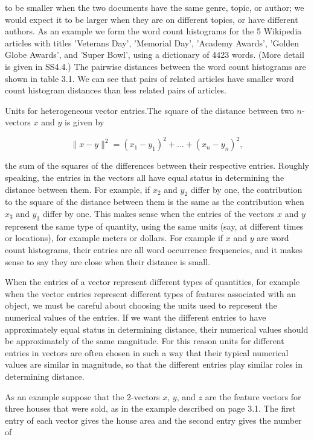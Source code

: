 to be smaller when the two documents have the same genre, topic, or author; we would expect it to be larger when they are on different topics, or have different authors. As an example we form the word count histograms for the 5 Wikipedia articles with titles 'Veterans Day', 'Memorial Day', 'Academy Awards', 'Golden Globe Awards', and 'Super Bowl', using a dictionary of 4423 words. (More detail is given in SS4.4.) The pairwise distances between the word count histograms are shown in table 3.1. We can see that pairs of related articles have smaller word count histogram distances than less related pairs of articles.

Units for heterogeneous vector entries.The square of the distance between two \(n\)-vectors \(x\) and \(y\) is given by

\[\|x-y\|^{2}=(x_{1}-y_{1})^{2}+\dots+(x_{n}-y_{n})^{2},\]

the sum of the squares of the differences between their respective entries. Roughly speaking, the entries in the vectors all have equal status in determining the distance between them. For example, if \(x_{2}\) and \(y_{2}\) differ by one, the contribution to the square of the distance between them is the same as the contribution when \(x_{3}\) and \(y_{3}\) differ by one. This makes sense when the entries of the vectors \(x\) and \(y\) represent the same type of quantity, using the same units (say, at different times or locations), for example meters or dollars. For example if \(x\) and \(y\) are word count histograms, their entries are all word occurrence frequencies, and it makes sense to say they are close when their distance is small.

When the entries of a vector represent different types of quantities, for example when the vector entries represent different types of features associated with an object, we must be careful about choosing the units used to represent the numerical values of the entries. If we want the different entries to have approximately equal status in determining distance, their numerical values should be approximately of the same magnitude. For this reason units for different entries in vectors are often chosen in such a way that their typical numerical values are similar in magnitude, so that the different entries play similar roles in determining distance.

As an example suppose that the 2-vectors \(x\), \(y\), and \(z\) are the feature vectors for three houses that were sold, as in the example described on page 3.1. The first entry of each vector gives the house area and the second entry gives the number of

